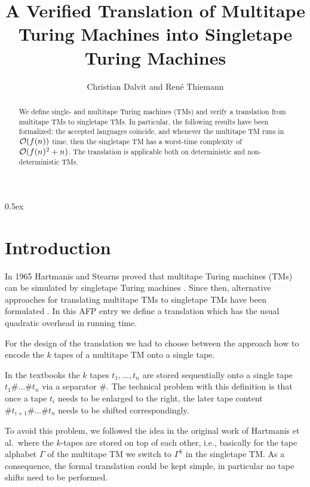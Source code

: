 \documentclass[11pt,a4paper]{article}
\newcommand{\OO}{{\cal O}}
\begin{document}
\title{A Verified Translation of Multitape Turing Machines into Singletape Turing Machines}
\author{Christian Dalvit and Ren\'e Thiemann}

\maketitle

\begin{abstract}
We define single- and multitape Turing machines (TMs)
and verify a translation from multitape TMs to singletape TMs. In particular, the following results have been
formalized: the accepted languages coincide, and whenever the multitape TM runs in
$\OO(f(n))$ time, then the singletape TM has a worst-time complexity of
$\OO(f(n)^2 + n)$.
The translation is applicable both on deterministic and non-deterministic TMs.
\end{abstract}

\tableofcontents

\parindent 0pt\parskip 0.5ex

\section{Introduction}
In 1965 Hartmanis and Stearns proved that multitape Turing machines (TMs) can be simulated by singletape Turing machines 
\cite{hartmanis:1965}. Since then, alternative approaches for translating multitape TMs to singletape TMs have
been formulated \cite{hopcroft:2014, sipser:2006}. In this AFP entry we define a translation which has the usual quadratic overhead in running
time. 

For the design of the translation we had to choose between
the approach how to encode the $k$ tapes of a multitape
TM onto a single tape.

In the textbooks \cite{hopcroft:2014, sipser:2006}
the $k$ tapes $t_1,\dots,t_n$ are stored sequentially onto a single tape $t_1 \# \dots \# t_n$ via a separator $\#$.
The technical problem with this definition is that once a tape $t_i$ 
needs to be enlarged to the right, the later tape content 
$\# t_{i+1} \# \dots \# t_n$ needs to
be shifted correspondingly.

To avoid this problem, we followed the idea in the original work of
Hartmanis et al.\ where the $k$-tapes are stored on top of each other, i.e., basically for the tape alphabet $\Gamma$ of the multitape TM we switch
to $\Gamma^k$ in the singletape TM. As a consequence, the formal 
translation could be kept simple, in particular no tape shifts need to be performed.






\end{document}
